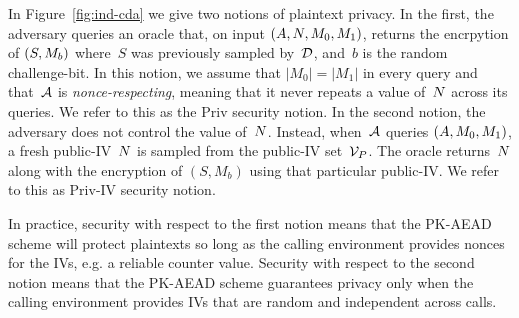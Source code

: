 In Figure~\ref{fig:ind-cda} we give two notions of plaintext privacy.  In the first, the adversary queries an oracle that, on input $(A,N,M_0,M_1)$, returns the encrpytion of $(S,M_b)$ where~$S$ was previously sampled by~${\cal D}$, and~$b$ is the random challenge-bit.  In this notion, we assume that $|M_0|=|M_1|$ in every query and that~${\cal A}$ is \emph{nonce-respecting}, meaning that it never repeats a value of~$N$ across its queries.  We refer to this as the Priv security notion.
In the second notion, the adversary does not control the value of~$N$.  Instead, when~${\cal A}$ queries $(A,M_0,M_1)$, a fresh public-IV~$N$ is sampled from the public-IV set~$\mathcal{V}_P$.  The oracle returns~$N$ along with the encryption of $(S,M_b)$ using that particular public-IV.  We refer to this as Priv-IV security notion.

In practice, security with respect to the first notion means that the PK-AEAD scheme will protect plaintexts so long as the calling environment provides nonces for the IVs, e.g. a reliable counter value.  Security with respect to the second notion means that the PK-AEAD scheme guarantees privacy only when the calling environment provides IVs that are random and independent across calls.


